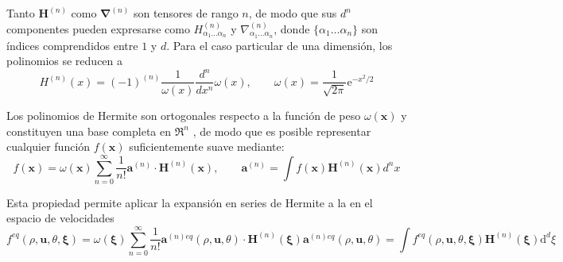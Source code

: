 Tanto $\bm{H}^{(n)}$ como $\bm{\nabla}^{(n)}$ son tensores de rango $n$, de modo que sus $d^n$ componentes pueden expresarse como $H^{(n)}_{\alpha_1 \ldots \alpha_n}$ y $\nabla^{(n)}_{\alpha_1 \ldots \alpha_n}$, donde $\{\alpha_1 \ldots \alpha_n\}$ son \'indices comprendidos entre $1$ y $d$. Para el caso particular de una dimensi\'on, los polinomios se reducen a
\begin{equation}
	H^{(n)}(x)=(-1)^{(n)} \dfrac{1}{\omega(x)} \dfrac{d^n}{dx^n}\omega(x), \qquad 
	\omega(x) = \dfrac{1}{\sqrt{2\pi}}\mbox{e}^{-x^2/2}
\end{equation}

Los polinomios de Hermite son ortogonales respecto a la funci\'on de peso $\omega(\bm{x})$ y constituyen una base completa en $\Re^n$ \cite{wiener_fourier_1989}, de modo que es posible representar cualquier funci\'on $f(\bm{x})$ suficientemente suave mediante:
\begin{equation}
	f(\bm{x}) = \omega(\bm{x}) \sum_{n=0}^{\infty}\dfrac{1}{n!}\bm{a}^{(n)} \cdot \bm{H}^{(n)}(\bm{x}), \qquad 
	\bm{a}^{(n)} = \int f(\bm{x})\bm{H}^{(n)}(\bm{x}) d^nx
\end{equation}

Esta propiedad permite aplicar la expansi\'on en series de Hermite a la \edf{} en el espacio de velocidades
\begin{subequations}
	\begin{equation}
		f^{eq}(\rho, \bm{u}, \theta, \bm{\xi}) = \omega(\bm{\xi}) \sum_{n=0}^{\infty}\dfrac{1}{n!}\bm{a}^{(n)eq}(\rho, \bm{u}, \theta) \cdot \bm{H}^{(n)}(\bm{\xi})
	\end{equation}
	\begin{equation}
		\bm{a}^{(n)eq}(\rho, \bm{u}, \theta) = \int f^{eq}(\rho, \bm{u}, \theta, \bm{\xi})\bm{H}^{(n)}(\bm{\xi}) \mbox{d}^d \xi
	\end{equation}
	\label{eq:feq_hermite}
\end{subequations}

